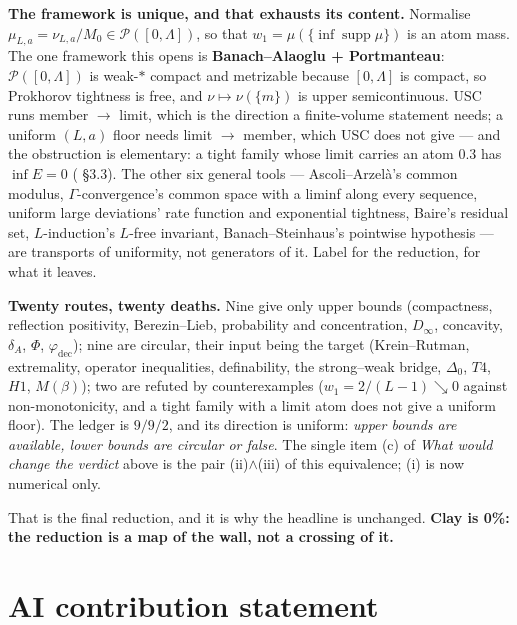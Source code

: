 \textbf{The framework is unique, and that exhausts its content.} Normalise
$\mu_{L,a}=\nu_{L,a}/M_0\in\mathcal{P}([0,\Lambda])$, so that
$w_1=\mu(\{\inf\operatorname{supp}\mu\})$ is an atom mass. The one framework this opens is
\textbf{Banach--Alaoglu + Portmanteau}: $\mathcal{P}([0,\Lambda])$ is weak-$*$ compact and
metrizable because $[0,\Lambda]$ is compact, so Prokhorov tightness is free, and
$\nu\mapsto\nu(\{m\})$ is upper semicontinuous. USC runs member $\to$ limit, which is the
direction a finite-volume statement needs; a uniform $(L,a)$ floor needs limit $\to$ member,
which USC does not give --- and the obstruction is elementary: a tight family whose limit carries
an atom $0.3$ has $\inf E=0$ ( \S3.3). The other six general tools ---
Ascoli--Arzel\`a's common modulus, $\Gamma$-convergence's common space with a liminf along every
sequence, uniform large deviations' rate function and exponential tightness, Baire's residual
set, $L$-induction's $L$-free invariant, Banach--Steinhaus's pointwise hypothesis --- are
transports of uniformity, not generators of it. Label \LC{} for the reduction, \LM{} for what it
leaves.

\textbf{Twenty routes, twenty deaths.} Nine give only upper bounds (compactness, reflection
positivity, Berezin--Lieb, probability and concentration, $D_\infty$, concavity, $\delta_A$,
$\Phi$, $\varphi_{\mathrm{dec}}$); nine are circular, their input being the target
(Krein--Rutman, extremality, operator inequalities, definability, the strong--weak bridge,
$\Delta_0$, $T4$, $H1$, $M(\beta)$); two are refuted by counterexamples ($w_1=2/(L-1)\searrow0$
against non-monotonicity, and a tight family with a limit atom does not give a uniform floor).
The ledger is $9/9/2$, and its direction is uniform: \emph{upper bounds are available, lower
bounds are circular or false}. The single item (c) of \emph{What would change the verdict} above
is the pair (ii)$\wedge$(iii) of this equivalence; (i) is now numerical only.

That is the final reduction, and it is why the headline is unchanged. \textbf{Clay is 0\%: the
reduction is a map of the wall, not a crossing of it.}

\section{AI contribution statement}
\label{sec:ai}

